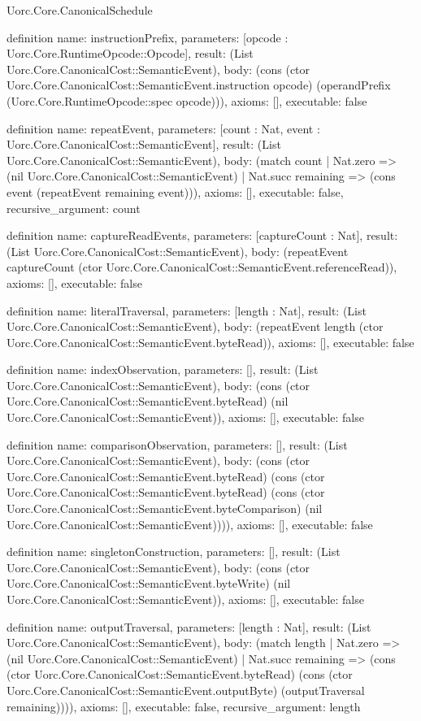 \begin{lexlean}{Uorc.Core.CanonicalSchedule}
\begin{semanticmodule}
definition{
  name: instructionPrefix,
  parameters: [opcode : Uorc.Core.RuntimeOpcode::Opcode],
  result: (List Uorc.Core.CanonicalCost::SemanticEvent),
  body: (cons (ctor Uorc.Core.CanonicalCost::SemanticEvent.instruction opcode) (operandPrefix (Uorc.Core.RuntimeOpcode::spec opcode))),
  axioms: [],
  executable: false
}

definition{
  name: repeatEvent,
  parameters: [count : Nat, event : Uorc.Core.CanonicalCost::SemanticEvent],
  result: (List Uorc.Core.CanonicalCost::SemanticEvent),
  body: (match count
    | Nat.zero => (nil Uorc.Core.CanonicalCost::SemanticEvent)
    | Nat.succ remaining => (cons event (repeatEvent remaining event))),
  axioms: [],
  executable: false,
  recursive_argument: count
}

definition{
  name: captureReadEvents,
  parameters: [captureCount : Nat],
  result: (List Uorc.Core.CanonicalCost::SemanticEvent),
  body: (repeatEvent captureCount (ctor Uorc.Core.CanonicalCost::SemanticEvent.referenceRead)),
  axioms: [],
  executable: false
}

definition{
  name: literalTraversal,
  parameters: [length : Nat],
  result: (List Uorc.Core.CanonicalCost::SemanticEvent),
  body: (repeatEvent length (ctor Uorc.Core.CanonicalCost::SemanticEvent.byteRead)),
  axioms: [],
  executable: false
}

definition{
  name: indexObservation,
  parameters: [],
  result: (List Uorc.Core.CanonicalCost::SemanticEvent),
  body: (cons (ctor Uorc.Core.CanonicalCost::SemanticEvent.byteRead) (nil Uorc.Core.CanonicalCost::SemanticEvent)),
  axioms: [],
  executable: false
}

definition{
  name: comparisonObservation,
  parameters: [],
  result: (List Uorc.Core.CanonicalCost::SemanticEvent),
  body: (cons (ctor Uorc.Core.CanonicalCost::SemanticEvent.byteRead) (cons (ctor Uorc.Core.CanonicalCost::SemanticEvent.byteRead) (cons (ctor Uorc.Core.CanonicalCost::SemanticEvent.byteComparison) (nil Uorc.Core.CanonicalCost::SemanticEvent)))),
  axioms: [],
  executable: false
}

definition{
  name: singletonConstruction,
  parameters: [],
  result: (List Uorc.Core.CanonicalCost::SemanticEvent),
  body: (cons (ctor Uorc.Core.CanonicalCost::SemanticEvent.byteWrite) (nil Uorc.Core.CanonicalCost::SemanticEvent)),
  axioms: [],
  executable: false
}

definition{
  name: outputTraversal,
  parameters: [length : Nat],
  result: (List Uorc.Core.CanonicalCost::SemanticEvent),
  body: (match length
    | Nat.zero => (nil Uorc.Core.CanonicalCost::SemanticEvent)
    | Nat.succ remaining => (cons (ctor Uorc.Core.CanonicalCost::SemanticEvent.byteRead) (cons (ctor Uorc.Core.CanonicalCost::SemanticEvent.outputByte) (outputTraversal remaining)))),
  axioms: [],
  executable: false,
  recursive_argument: length
}


\end{semanticmodule}
\end{lexlean}
